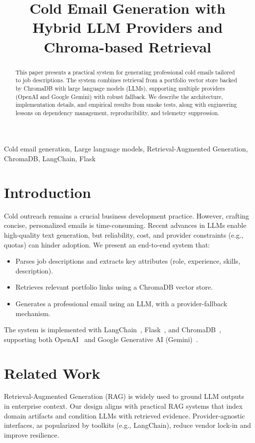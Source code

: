 \documentclass[conference]{IEEEtran}
\title{Cold Email Generation with Hybrid LLM Providers and Chroma-based Retrieval}
\author{\IEEEauthorblockN{Soham Pal}
\IEEEauthorblockA{\textit{Independent Researcher} \\
Email: soham@example.com}
}
\begin{document}
\maketitle

\begin{abstract}
This paper presents a practical system for generating professional cold emails tailored to job descriptions. The system combines retrieval from a portfolio vector store backed by ChromaDB with large language models (LLMs), supporting multiple providers (OpenAI and Google Gemini) with robust fallback. We describe the architecture, implementation details, and empirical results from smoke tests, along with engineering lessons on dependency management, reproducibility, and telemetry suppression.
\end{abstract}

\begin{IEEEkeywords}
Cold email generation, Large language models, Retrieval-Augmented Generation, ChromaDB, LangChain, Flask
\end{IEEEkeywords}

\section{Introduction}
Cold outreach remains a crucial business development practice. However, crafting concise, personalized emails is time-consuming. Recent advances in LLMs enable high-quality text generation, but reliability, cost, and provider constraints (e.g., quotas) can hinder adoption. We present an end-to-end system that:
\begin{itemize}
  \item Parses job descriptions and extracts key attributes (role, experience, skills, description).
  \item Retrieves relevant portfolio links using a ChromaDB vector store.
  \item Generates a professional email using an LLM, with a provider-fallback mechanism.
\end{itemize}
The system is implemented with LangChain~\cite{langchain}, Flask~\cite{flask}, and ChromaDB~\cite{chromadb}, supporting both OpenAI~\cite{openai} and Google Generative AI (Gemini)~\cite{gemini}.

\section{Related Work}
Retrieval-Augmented Generation (RAG) is widely used to ground LLM outputs in enterprise context. Our design aligns with practical RAG systems that index domain artifacts and condition LLMs with retrieved evidence. Provider-agnostic interfaces, as popularized by toolkits (e.g., LangChain), reduce vendor lock-in and improve resilience.
\end{document}
